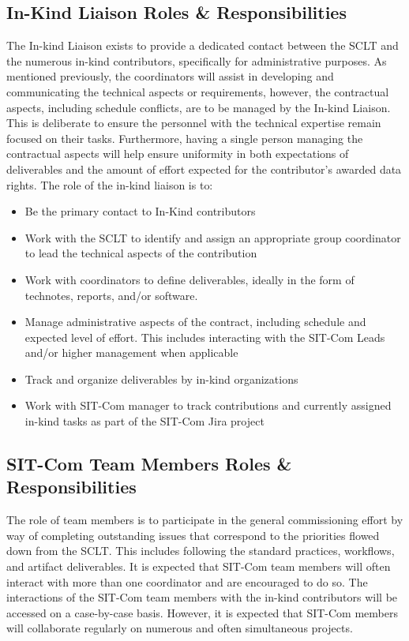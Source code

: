 \documentclass[SE,lsstdraft,authoryear,toc]{lsstdoc, lsstdraft}
\begin{document}
\subsection{In-Kind Liaison Roles \& Responsibilities}
\label{sec:in_kind_r_and_r}
The In-kind Liaison exists to provide a dedicated contact between the SCLT and the numerous in-kind contributors, specifically for administrative purposes.
As mentioned previously, the coordinators will assist in developing and communicating the technical aspects or requirements, however, the contractual aspects, including schedule conflicts, are to be managed by the In-kind Liaison.
This is deliberate to ensure the personnel with the technical expertise remain focused on their tasks.
Furthermore, having a single person managing the contractual aspects will help ensure uniformity in both expectations of deliverables and the amount of effort expected for the contributor's awarded data rights.
The role of the in-kind liaison is to:
\begin{itemize}
    \item Be the primary contact to In-Kind contributors
    \item Work with the SCLT to identify and assign an appropriate group coordinator to lead the technical aspects of the contribution
    \item Work with coordinators to define deliverables, ideally in the form of technotes, reports, and/or software.
    \item Manage administrative aspects of the contract, including schedule and expected level of effort.
    This includes interacting with the SIT-Com Leads and/or higher management when applicable
    \item Track and organize deliverables by in-kind organizations
    \item Work with SIT-Com manager to track contributions and currently assigned in-kind tasks as part of the SIT-Com Jira project
\end{itemize}

\subsection{SIT-Com Team Members Roles \& Responsibilities}
The role of team members is to participate in the general commissioning effort by way of completing outstanding issues that correspond to the priorities flowed down from the SCLT.
This includes following the standard practices, workflows, and artifact deliverables.
It is expected that SIT-Com team members will often interact with more than one coordinator and are encouraged to do so.
The interactions of the SIT-Com team members with the in-kind contributors will be accessed on a case-by-case basis.
However, it is expected that SIT-Com members will collaborate regularly on numerous and often simultaneous projects.
\end{document}
